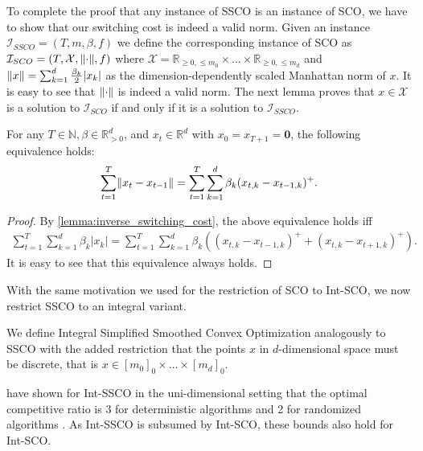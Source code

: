 To complete the proof that any instance of SSCO is an instance of SCO, we have to show that our switching cost is indeed a valid norm. Given an instance $\mathcal{I}_{SSCO} = (T, m, \beta, f)$ we define the corresponding instance of SCO as $\mathcal{I}_{SCO} = (T, \mathcal{X}, \lVert\cdot\rVert, f)$ where $\mathcal{X} = \mathbb{R}_{\geq 0, \leq m_0} \times \dots \times \mathbb{R}_{\geq 0, \leq m_d}$ and $\lVert x\rVert = \sum_{k=1}^d \frac{\beta_k}{2} |x_k|$ as the dimension-dependently scaled Manhattan norm of $x$. It is easy to see that $\lVert\cdot\rVert$ is indeed a valid norm. The next lemma proves that $x \in \mathcal{X}$ is a solution to $\mathcal{I}_{SCO}$ if and only if it is a solution to $\mathcal{I}_{SSCO}$.

\begin{lemma}
For any $T \in \mathbb{N}, \beta \in \mathbb{R}_{>0}^d$, and $x_t \in \mathbb{R}^d$ with $x_0 = x_{T+1} = \mathbf{0}$, the following equivalence holds:
\begin{align*}
    \sum_{t=1}^T \lVert x_t - x_{t-1}\rVert = \sum_{t=1}^T \sum_{k=1}^d \beta_k (x_{t,k} - x_{t-1,k})^+.
\end{align*}
\end{lemma}
\begin{proof}
By \autoref{lemma:inverse_switching_cost}, the above equivalence holds iff \begin{align*}
    \sum_{t=1}^T \sum_{k=1}^d \beta_k |x_k| = \sum_{t=1}^T \sum_{k=1}^d \beta_k ((x_{t,k} - x_{t-1,k})^+ + (x_{t,k} - x_{t+1,k})^+).
\end{align*}
It is easy to see that this equivalence always holds.
\end{proof}

With the same motivation we used for the restriction of SCO to Int-SCO, we now restrict SSCO to an integral variant.

\begin{problem}
We define Integral Simplified Smoothed Convex Optimization analogously to SSCO with the added restriction that the points $x$ in $d$-dimensional space must be discrete, that is $x \in [m_0]_0 \times \dots \times [m_d]_0$.
\end{problem}

\citeauthor*{Albers2018} have shown for Int-SSCO in the uni-dimensional setting that the optimal competitive ratio is 3 for deterministic algorithms and 2 for randomized algorithms \cite{Albers2018}. As Int-SSCO is subsumed by Int-SCO, these bounds also hold for Int-SCO.

